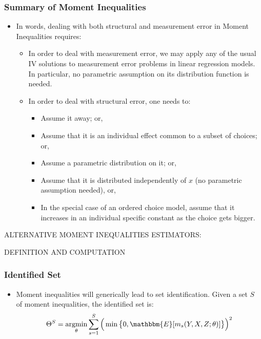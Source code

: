 \begin{frame}
\frametitle{Summary of Moment Inequalities}

\begin{itemize}
	\item In words, dealing with both structural and measurement error in Moment Inequalities requires:
	\begin{itemize}
		\item In order to deal with measurement error, we may apply any of the usual IV solutions to measurement error problems in linear regression models. In particular, no parametric assumption on its distribution function is needed.
		\item In order to deal with structural error, one needs to:
		\begin{itemize}
			\item Assume it away; or,
			\item Assume that it is an individual effect common to a subset of choices; or,
			\item Assume a parametric distribution on it; or,
			\item Assume that it is distributed independently of $x$ (no parametric assumption needed), or,
			\item In the special case of an ordered choice model, assume that it increases in an individual specific constant as the choice gets bigger.
		\end{itemize}
	\end{itemize}
\end{itemize}
\end{frame}
\begin{frame}
\centerline{ALTERNATIVE MOMENT INEQUALITIES ESTIMATORS:}
\centerline{DEFINITION AND COMPUTATION}
\end{frame}
\begin{frame}
\frametitle{Identified Set}

\begin{itemize}
	\item Moment inequalities will generically lead to set identification. Given a set $S$ of moment inequalities, the identified set is:
	\begin{equation*}
	\Theta^{S}=\argmin_{\theta}\sum_{s=1}^{S}\Big(\min\big\{0,\mathbbm{E}[m_{s}(Y,X,Z;\theta)]\big\}\Big)^{2}
	\end{equation*}
	\begin{figure}[h!]
	\begin{center}
	\end{center}
	\end{figure}	
\end{itemize}
\end{frame}
